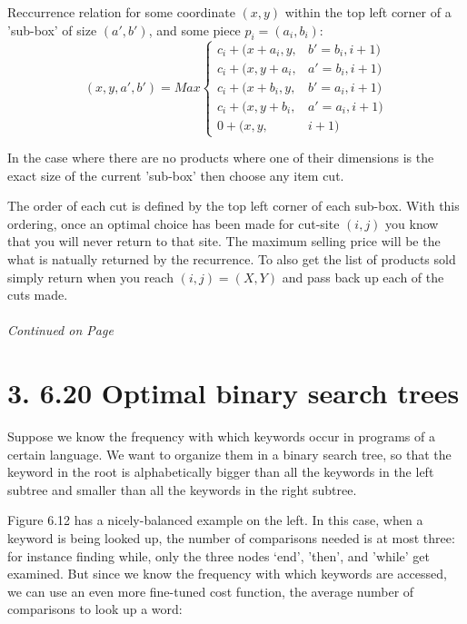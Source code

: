 \documentclass[11pt]{article}
\begin{document}
Reccurrence relation for some coordinate $(x,y)$ within the top left corner of a 'sub-box' of size $(a',b')$, and some piece $p_i=(a_i,b_i)$:
\begin{displaymath}
   (x,y,a',b') = Max  \left\{
     \begin{array}{lr}
        c_i + (x+a_i,y,&b'=b_i,i+1)\\
        c_i + (x,y+a_i,&a'=b_i,i+1)\\
        c_i + (x+b_i,y,&b'=a_i,i+1)\\
        c_i + (x,y+b_i,&a'=a_i,i+1)\\
        0   + (x,y,&i+1)
     \end{array}
   \right.
\end{displaymath}

In the case where there are no products where one of their dimensions is the exact size of the current 'sub-box' then choose any item cut.

The order of each cut is defined by the top left corner of each sub-box. With this ordering, once an optimal choice has been made for cut-site
$(i,j)$ you know that you will never return to that site. The maximum selling price will be the what is natually returned by the recurrence. 
To also get the list of products sold simply return
when you reach $(i,j)=(X,Y)$ and pass back up each of the cuts made.

\label{pg:end-of-p2}
%
 \paragraph{} \emph{Continued on Page \pageref{pg:p2-continuation}}

\newpage

\section*{3. 6.20 Optimal binary search trees}

Suppose we know the frequency with which keywords occur in programs of a certain language.
We want to organize them in a binary search tree, so that the keyword in the root is alphabetically bigger than all the keywords in the left subtree and smaller than all the keywords in the right subtree.

Figure 6.12 has a nicely-balanced example on the left. In this case, when a keyword is being looked up, the number of comparisons needed is at most three: for instance finding while, only the three nodes `end', 'then', and 'while' get examined.
But since we know the frequency with which keywords are accessed, we can use an even more fine-tuned cost function, the average number of comparisons to look up a word: 
\end{document}
